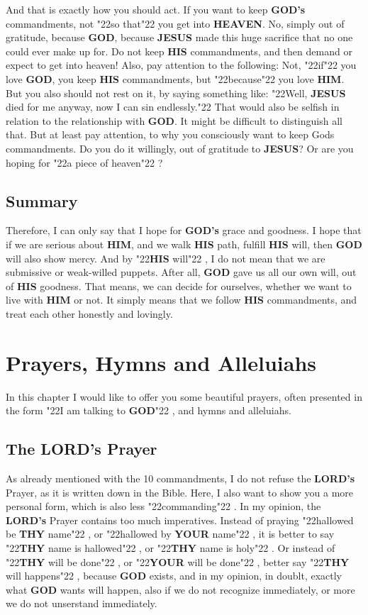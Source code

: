\documentclass[12pt,a4paper]{article}
\newcommand{\God}[0]{\textbf{GOD}}
\newcommand{\Gods}[0]{\textbf{GOD's}}
\newcommand{\Heaven}[0]{\textbf{HEAVEN}}
\newcommand{\Him}[0]{\textbf{HIM}}
\newcommand{\His}[0]{\textbf{HIS}}
\newcommand{\Jesus}[0]{\textbf{JESUS}}
\newcommand{\Lords}[0]{\textbf{LORD's}}
\newcommand{\Thy}[0]{\textbf{THY}}
\newcommand{\Your}[0]{\textbf{YOUR}}
\newcommand{\q}[1]{\char"22{#1}\char"22 }
\begin{document}
		And that is exactly how you should act.
		If you want to keep {\Gods} commandments,
		not \q{so that} you get into {\Heaven}.
		No,
		simply out of gratitude,
		because {\God},
		because {\Jesus} made this huge sacrifice that no one could ever make up for.
		Do not keep {\His} commandments,
		and then demand or expect to get into heaven!
		Also,
		pay attention to the following:
		Not,
		\q{if} you love {\God},
		you keep {\His} commandments,
		but \q{because} you love {\Him}.
		But you also should not rest on it,
		by saying something like:
		\q{Well,
		{\Jesus} died for me anyway,
		now I can sin endlessly.}
		That would also be selfish in relation to the relationship with {\God}.
		It might be difficult to distinguish all that.
		But at least pay attention,
		to why you consciously want to keep {Gods} commandments.
		Do you do it willingly,
		out of gratitude to {\Jesus}?
		Or are you hoping for \q{a piece of heaven}?
		
	\subsection{Summary}
		Therefore,
		I can only say that I hope for {\Gods} grace and goodness.
		I hope that if we are serious about {\Him},
		and we walk {\His} path,
		fulfill {\His} will,
		then {\God} will also show mercy.
		And by \q{{\His} will},
		I do not mean that we are submissive or weak-willed puppets.
		After all,
		{\God} gave us all our own will,
		out of {\His} goodness.
		That means,
		we can decide for ourselves,
		whether we want to live with {\Him} or not.
		It simply means that we follow {\His} commandments,
		and treat each other honestly and lovingly.

	\newpage
	\section{Prayers, Hymns and Alleluiahs}
		In this chapter I would like to offer you some beautiful prayers,
		often presented in the form \q{I am talking to {\God}},
		and hymns and alleluiahs.

	\subsection{The {\Lords} Prayer}
		As already mentioned with the 10 commandments,
		I do not refuse the {\Lords} Prayer,
		as it is written down in the Bible.
		Here,
		I also want to show you a more personal form,
		which is also less \q{commanding}.
		In my opinion,
		the {\Lords} Prayer contains too much imperatives.
		Instead of praying \q{hallowed be {\Thy} name},
		or \q{hallowed by {\Your} name},
		it is better to say \q{{\Thy} name is hallowed},
		or \q{{\Thy} name is holy}.
		Or instead of \q{{\Thy} will be done},
		or \q{{\Your} will be done},
		better say \q{{\Thy} will happens},
		because {\God} exists,
		and in my opinion,
		in doublt,
		exactly what {\God} wants will happen,
		also if we do not recognize immediately,
		or more we do not unserstand immediately.
\end{document}
